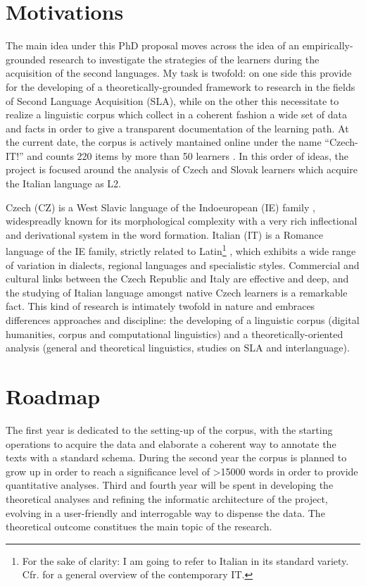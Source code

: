 \documentclass[a4paper,twoside,11pt,chapterprefix=true,listof=totocnumbered,bibliography=totocnumbered]{scrbook}
\theoremstyle{definition}
\theoremstyle{definition}
\theoremstyle{definition}
\theoremstyle{remark}
\begin{document}
\section{Motivations}\label{motivations}

The main idea under this PhD proposal moves across the idea of an
empirically-grounded research to investigate the strategies of the
learners during the acquisition of the second languages. My task is
twofold: on one side this provide for the developing of a
theoretically-grounded framework to research in the fields of Second
Language Acquisition (SLA), while on the other this necessitate to
realize a linguistic corpus which collect in a coherent fashion a wide
set of data and facts in order to give a transparent documentation of
the learning path. At the current date, the corpus is actively mantained
online under the name \enquote{Czech-IT!} and counts 220 items by more
than 50 learners \citep{czech-it}. In this order of ideas, the project
is focused around the analysis of Czech and Slovak learners which
acquire the Italian language as L2.

Czech (CZ) is a West Slavic language of the Indoeuropean (IE) family
\citep[\citet{glottolog}]{beekes_comparative_2011}, widespreadly known
for its morphological complexity with a very rich inflectional and
derivational system in the word formation. Italian (IT) is a Romance
language of the IE family, strictly related to Latin\footnote{For the
  sake of clarity: I am going to refer to Italian in its standard
  variety. Cfr.
  \citep[\citet{d_achille-italiano}]{berruto2012sociolinguistica} for a
  general overview of the contemporary IT.} , which exhibits a wide
range of variation in dialects, regional languages and specialistic
styles. Commercial and cultural links between the Czech Republic and
Italy are effective and deep, and the studying of Italian language
amongst native Czech learners is a remarkable fact. This kind of
research is intimately twofold in nature and embraces differences
approaches and discipline: the developing of a linguistic corpus
(digital humanities, corpus and computational linguistics) and a
theoretically-oriented analysis (general and theoretical linguistics,
studies on SLA and interlanguage).

\section{Roadmap}\label{roadmap-1}

The first year is dedicated to the setting-up of the corpus, with the
starting operations to acquire the data and elaborate a coherent way to
annotate the texts with a standard schema. During the second year the
corpus is planned to grow up in order to reach a significance level of
\textgreater{}15000 words in order to provide quantitative analyses.
Third and fourth year will be spent in developing the theoretical
analyses and refining the informatic architecture of the project,
evolving in a user-friendly and interrogable way to dispense the data.
The theoretical outcome constitues the main topic of the research.
\end{document}
